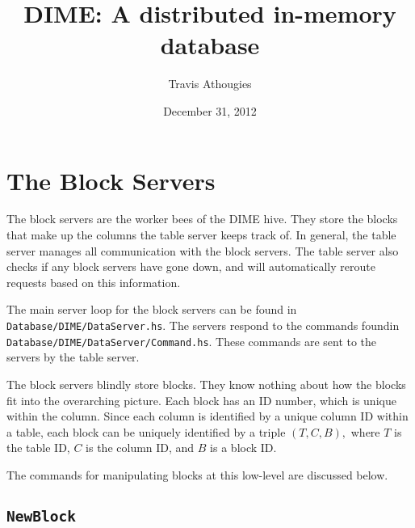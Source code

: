 \documentclass{article}
\newcommand{\filepath}[1]{\texttt{#1}}
\newcommand{\command}[1]{\texttt{#1}}
\begin{document}
\title{DIME: A distributed in-memory database}
\author{Travis Athougies}
\date{December 31, 2012}
\maketitle

\section{The Block Servers}

The block servers are the worker bees of the DIME hive. They store the blocks that make up the
columns the table server keeps track of. In general, the table server manages all communication with
the block servers. The table server also checks if any block servers have gone down, and will
automatically reroute requests based on this information.

The main server loop for the block servers can be found in
\filepath{Database/DIME/DataServer.hs}. The servers respond to the commands foundin
\filepath{Database/DIME/DataServer/Command.hs}. These commands are sent to the servers by the table
server.

The block servers blindly store blocks. They know nothing about how the blocks fit into the
overarching picture. Each block has an ID number, which is unique within the column. Since each
column is identified by a unique column ID within a table, each block can be uniquely identified by
a triple $(T, C, B),$ where $T$ is the table ID, $C$ is the column ID, and $B$ is a block ID.

The commands for manipulating blocks at this low-level are discussed below.

\subsection{\command{NewBlock}}
\end{document}
